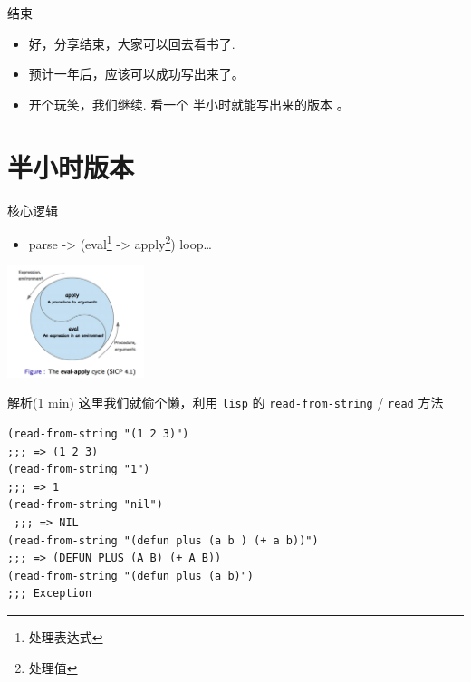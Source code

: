 \documentclass[presentation, bigger]{beamer}
\begin{document}
\begin{frame}[label={sec:orga8944f3}]{结束}
\begin{itemize}
\item <+-> 好，分享结束，大家可以回去看书了.
\item <2-> 预计一年后，应该可以成功写出来了。
\item <3> 开个玩笑，我们继续. 看一个 \alert{半小时就能写出来的版本} 。
\end{itemize}
\end{frame}

\section{半小时版本}
\label{sec:org701a80c}
\begin{frame}[label={sec:org2d32788}]{核心逻辑}
\begin{itemize}
\item parse -> (eval\footnote{处理表达式} -> apply\footnote{处理值}) loop\ldots{}
\end{itemize}
\begin{center}
\includegraphics[width=0.3\textwidth]{./img/eval-apply.png}
\end{center}
\end{frame}
\begin{frame}[fragile,label={sec:orgaa054ab}]{解析(1 min)}
 这里我们就偷个懒，利用 \texttt{lisp} 的 \texttt{read-from-string} / \texttt{read} 方法

\begin{lstlisting}
(read-from-string "(1 2 3)")
;;; => (1 2 3)
(read-from-string "1")
;;; => 1
(read-from-string "nil")
 ;;; => NIL
(read-from-string "(defun plus (a b ) (+ a b))")
;;; => (DEFUN PLUS (A B) (+ A B))
(read-from-string "(defun plus (a b)")
;;; Exception
\end{lstlisting}
\end{frame}
\end{document}
